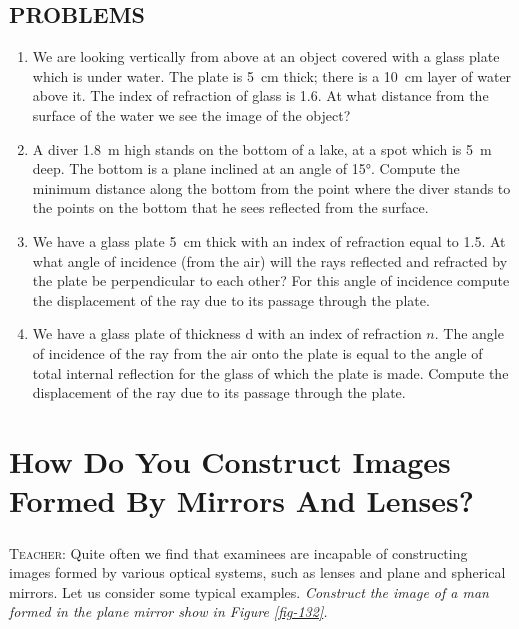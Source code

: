 \documentclass[a4paper,sfsidenotes]{tufte-book}
\begin{document}
\section{PROBLEMS}
\label{sec-33-1}

\begin{enumerate}[resume=problems]
\item We are looking vertically from above at an object covered with a glass plate which is under water. The plate is \SI{5}{\centi\meter} thick; there is a \SI{10}{\centi\meter} layer of water above it. The index of refraction of glass is 1.6. At what distance from the surface of the water we see the image of the object?
\item A diver \SI{1.8}{\meter} high stands on the bottom of a lake, at a spot which is \SI{5}{\meter} deep. The bottom is a plane inclined at an angle of \ang{15}. Compute the minimum distance along the bottom from the point where the diver stands to the points on the bottom that he sees reflected from the surface.
\item We have a glass plate \SI{5}{\centi\meter} thick with an index of refraction equal to 1.5. At what angle of incidence (from the air) will the rays reflected and refracted by the plate be perpendicular to each other? For this angle of incidence compute the displacement of the ray due to its passage through the plate.
\item We have a glass plate of thickness d with an index of refraction $n$. The angle of incidence of the ray from the air onto the plate is equal to the angle of total internal reflection for the glass of which the plate is made. Compute the displacement of the ray due to its passage through the plate.
\end{enumerate}

\chapter{How Do You Construct Images Formed By Mirrors And Lenses?}
\label{ch-32}
\paragraph{}
\textsc{Teacher:} Quite often we find that examinees are incapable of constructing images formed by various optical systems, such as lenses and plane and spherical mirrors. Let us consider some typical examples. \emph{Construct the image of a man formed in the plane mirror show in \emph{Figure \ref{fig-132}}.}
\end{document}
